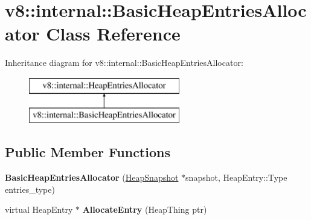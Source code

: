 \hypertarget{classv8_1_1internal_1_1_basic_heap_entries_allocator}{}\section{v8\+:\+:internal\+:\+:Basic\+Heap\+Entries\+Allocator Class Reference}
\label{classv8_1_1internal_1_1_basic_heap_entries_allocator}
Inheritance diagram for v8\+:\+:internal\+:\+:Basic\+Heap\+Entries\+Allocator\+:\begin{figure}[H]
\begin{center}
\leavevmode
\includegraphics[height=2.000000cm]{classv8_1_1internal_1_1_basic_heap_entries_allocator}
\end{center}
\end{figure}
\subsection*{Public Member Functions}
\begin{DoxyCompactItemize}
\item 
{\bfseries Basic\+Heap\+Entries\+Allocator} (\hyperlink{classv8_1_1internal_1_1_heap_snapshot}{Heap\+Snapshot} $\ast$snapshot, Heap\+Entry\+::\+Type entries\+\_\+type)\hypertarget{classv8_1_1internal_1_1_basic_heap_entries_allocator_a7a9fdb15588f5afce77f8794367f57ba}{}\label{classv8_1_1internal_1_1_basic_heap_entries_allocator_a7a9fdb15588f5afce77f8794367f57ba}

\item 
virtual Heap\+Entry $\ast$ {\bfseries Allocate\+Entry} (Heap\+Thing ptr)\hypertarget{classv8_1_1internal_1_1_basic_heap_entries_allocator_a23cc88e3401573d35d129fc477a16018}{}\label{classv8_1_1internal_1_1_basic_heap_entries_allocator_a23cc88e3401573d35d129fc477a16018}

\end{DoxyCompactItemize}
